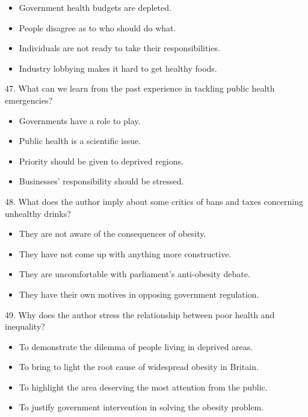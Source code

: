 \documentclass[UTF8,11pt]{ctexart}
\begin{document}
\begin{itemize}[leftmargin=2em,itemsep=.2em,topsep=.4em]\item[A.] Government health budgets are depleted.
\item[B.] People disagree as to who should do what.
\item[C.] Individuals are not ready to take their responsibilities.
\item[D.] Industry lobbying makes it hard to get healthy foods.
\end{itemize}

47. What can we learn from the past experience in tackling public health emergencies?


\begin{itemize}[leftmargin=2em,itemsep=.2em,topsep=.4em]\item[A.] Governments have a role to play.
\item[B.] Public health is a scientific issue.
\item[C.] Priority should be given to deprived regions.
\item[D.] Businesses' responsibility should be stressed.
\end{itemize}

48. What does the author imply about some critics of bans and taxes concerning unhealthy drinks?


\begin{itemize}[leftmargin=2em,itemsep=.2em,topsep=.4em]\item[A.] They are not aware of the consequences of obesity.
\item[B.] They have not come up with anything more constructive.
\item[C.] They are uncomfortable with parliament's anti-obesity debate.
\item[D.] They have their own motives in opposing government regulation.
\end{itemize}

49. Why does the author stress the relationship between poor health and inequality?


\begin{itemize}[leftmargin=2em,itemsep=.2em,topsep=.4em]\item[A.] To demonstrate the dilemma of people living in deprived areas.
\item[B.] To bring to light the root cause of widespread obesity in Britain.
\item[C.] To highlight the area deserving the most attention from the public.
\item[D.] To justify government intervention in solving the obesity problem.
\end{itemize}
\end{document}
